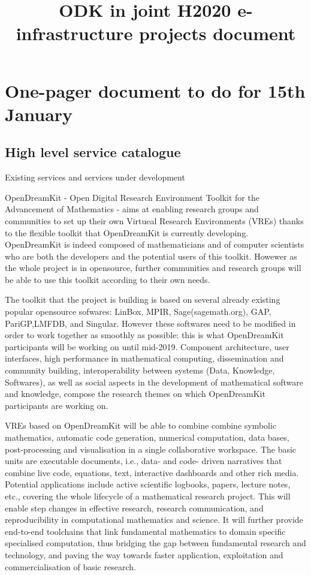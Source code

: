 \documentclass[12pt]{amsbook}
\title{ODK in joint H2020 e-infrastructure projects document}
\begin{document}
\maketitle

\section{One-pager document to do for 15th January}
\subsection{High level service catalogue}
Existing services and services under development


OpenDreamKit - Open Digital Research Environment Toolkit for the Advancement of Mathematics - aims at enabling research groups and communities to set up their own Virtueal Research Environments (VREs) thanks to the flexible toolkit that OpenDreamKit is currently developing.
OpenDreamKit is indeed composed of mathematicians and of computer scientists who are both the developers and the potential users of this toolkit. Howewer as the whole project is in opensource, further communities and research groups will be able to use this toolkit according to their own needs.

The toolkit that the project is building is based on several already existing popular opensource sofwares: LinBox, MPIR, Sage(sagemath.org), GAP, PariGP,LMFDB, and
Singular.
However these softwares need to be modified in order to work together as smoothly as possible: this is what OpenDreamKit participants will be working on until mid-2019. Component architecture, user interfaces, high performance in mathematical computing,  dissemination and community building,  interoperability between systems (Data, Knowledge, Softwares),  as well as social aspects in the development of mathematical software and knowledge, compose the research themes on which OpenDreamKit participants are working on.

VREs based on OpenDreamKit will be able to combine combine symbolic mathematics, automatic code generation, numerical computation, data bases, post-processing and visualisation in a single collaborative workspace. The basic units are executable documents, i.e., data- and code- driven narratives that combine live code, equations, text, interactive dashboards and other rich media. Potential applications include active scientific logbooks, papers, lecture notes, etc., covering the whole lifecycle of a mathematical research project.
This will enable step changes in effective research, research communication, and reproducibility in computational mathematics and science. It will further provide end-to-end toolchains that link fundamental mathematics to domain specific specialised computation, thus bridging the gap between fundamental research and technology, and paving the way towards faster application, exploitation and commercialisation of basic research.
\end{document}

